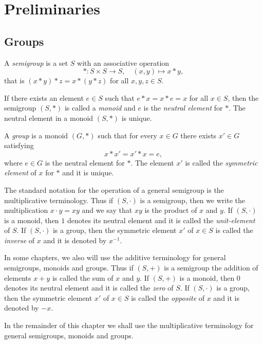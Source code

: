 \chapter{Preliminaries}
\label{preliminaries}


\section{Groups}

A {\em semigroup} is a set $S$ with an associative operation
\[ 
*\colon S\times S \longrightarrow S, 
\quad
(x,y)\mapsto x*y,
\]
that is $(x*y)*z=x*(y*z)$ for all $x,y,z\in S$.

If there exists an element $e\in S$ such that $e*x=x*e=x$ for all $x\in S$, then 
the semigroup $(S,*)$ is called a {\em monoid} and $e$ is the {\em neutral element} for $*$. 
The neutral element in a monoid $(S,*)$ is unique.

A {\em group} is a monoid $(G,*)$ such that for every $x\in G$ there exists $x'\in G$ satisfying
\[ 
x*x'=x'*x=e,
\]
where $e\in G$ is the neutral element for $*$. The element $x'$ is called 
the {\em symmetric element} of $x$ for $*$ and it is unique.

The standard notation for the operation of a general semigroup is the multiplicative terminology. 
Thus if $(S,\cdot)$ is a semigroup, then we write the multiplication  $x\cdot y=xy$  
and we say that $xy$ is the product of $x$ and $y$. If $(S,\cdot)$  is a monoid, 
then $1$ denotes its neutral element and it is called the {\em unit-element} of $S$. 
If $(S,\cdot)$ is a group, then the symmetric element $x'$ of $x\in S$ is called the {\em inverse} 
of $x$ and it is denoted by $x^{-1}$.

In some chapters, we also will use the additive terminology for general semigroups, monoids and groups. 
Thus if $(S,+)$ is a semigroup the addition of elements $x+y$ is called the sum of $x$ and $y$. If $(S,+)$ 
is a monoid, then $0$ denotes its neutral element and it is called the {\em zero} of $S$. 
If $(S,\cdot)$ is a group, then the symmetric element $x'$ of $x\in S$ is called the {\em opposite} of $x$ and it is denoted by $-x$.

In the remainder of this chapter we shall use the multiplicative terminology for general semigroups, monoids and groups.

